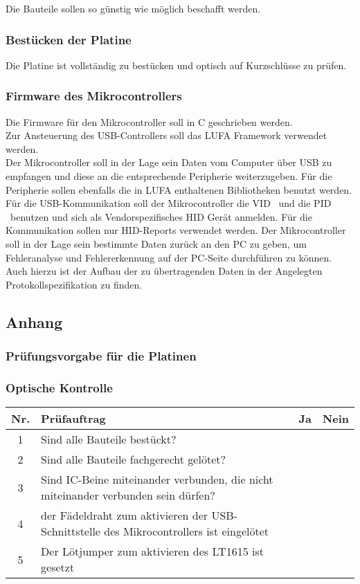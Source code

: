 Die Bauteile sollen so günstig wie möglich beschafft werden. 

\subsubsection{Bestücken der Platine}

Die Platine ist vollständig zu bestücken und optisch auf Kurzschlüsse zu prüfen.

\subsubsection{Firmware des Mikrocontrollers}

Die Firmware für den Mikrocontroller soll in C geschrieben werden.\\
Zur Ansteuerung des USB-Controllers soll das LUFA Framework verwendet werden.\\
Der Mikrocontroller soll in der Lage sein Daten vom Computer über USB zu empfangen und diese
an die entsprechende Peripherie weiterzugeben. Für die Peripherie sollen ebenfalls die in LUFA enthaltenen Bibliotheken
benutzt werden.\\
Für die USB-Kommunikation soll der Mikrocontroller die VID \VID\ und die PID \PID\ benutzen und sich als Vendorspezifisches HID Gerät anmelden. Für die Kommunikation sollen nur HID-Reports verwendet werden. Der Mikrocontroller soll in der Lage sein bestimmte Daten zurück an den PC zu geben, um Fehleranalyse und Fehlererkennung auf der PC-Seite durchführen zu können.
Auch hierzu ist der Aufbau der zu übertragenden Daten in der Angelegten Protokollspezifikation zu finden.
\pagebreak
\subsection{Anhang}
\subsubsection{Prüfungsvorgabe für die Platinen}
\subsubsection*{Optische Kontrolle}

\begin{flushleft}
	\begin{tabular}{|c||p{10cm}|c|c|}
		\hline
		Nr. & Prüfauftrag & Ja & Nein \\
		\hline
		1 & Sind alle Bauteile bestückt? & & \\
		\hline
		2 & Sind alle Bauteile fachgerecht gelötet? & & \\
		\hline
		3 & Sind IC-Beine miteinander verbunden, die nicht miteinander verbunden sein dürfen? & & \\
		\hline
		4 & der Fädeldraht zum aktivieren der USB-Schnittstelle des Mikrocontrollers ist eingelötet & & \\
		\hline
		5 & Der Lötjumper zum aktivieren des LT1615 ist gesetzt & & \\
		\hline
	\end{tabular}
\end{flushleft}


